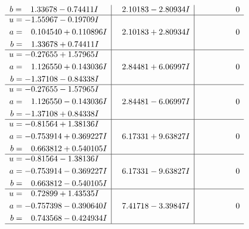 \documentclass[1p]{elsarticle_modified}
\theoremstyle{definition}
\begin{document}
$$\begin{array}{c|c|c}
\begin{aligned}
b &= \phantom{-}1.33678 - 0.74411 I\end{aligned}
 & \phantom{-}2.10183 - 2.80934 I & \phantom{-0.000000 } 0 \\ \hline\begin{aligned}
u &= -1.55967 - 0.19709 I \\
a &= \phantom{-}0.104540 + 0.110896 I \\
b &= \phantom{-}1.33678 + 0.74411 I\end{aligned}
 & \phantom{-}2.10183 + 2.80934 I & \phantom{-0.000000 } 0 \\ \hline\begin{aligned}
u &= -0.27655 + 1.57965 I \\
a &= \phantom{-}1.126550 + 0.143036 I \\
b &= -1.37108 - 0.84338 I\end{aligned}
 & \phantom{-}2.84481 + 6.06997 I & \phantom{-0.000000 } 0 \\ \hline\begin{aligned}
u &= -0.27655 - 1.57965 I \\
a &= \phantom{-}1.126550 - 0.143036 I \\
b &= -1.37108 + 0.84338 I\end{aligned}
 & \phantom{-}2.84481 - 6.06997 I & \phantom{-0.000000 } 0 \\ \hline\begin{aligned}
u &= -0.81564 + 1.38136 I \\
a &= -0.753914 + 0.369227 I \\
b &= \phantom{-}0.663812 + 0.540105 I\end{aligned}
 & \phantom{-}6.17331 + 9.63827 I & \phantom{-0.000000 } 0 \\ \hline\begin{aligned}
u &= -0.81564 - 1.38136 I \\
a &= -0.753914 - 0.369227 I \\
b &= \phantom{-}0.663812 - 0.540105 I\end{aligned}
 & \phantom{-}6.17331 - 9.63827 I & \phantom{-0.000000 } 0 \\ \hline\begin{aligned}
u &= \phantom{-}0.72899 + 1.43535 I \\
a &= -0.757398 - 0.390640 I \\
b &= \phantom{-}0.743568 - 0.424934 I\end{aligned}
 & \phantom{-}7.41718 - 3.39847 I & \phantom{-0.000000 } 0\\
 \hline 
 \end{array}$$\newpage$$\begin{array}{c|c|c}  

\end{array}$$
\end{document}

